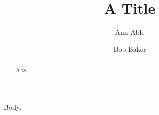 \documentclass[aip,jcp,reprint]{revtex4-2}
\begin{document}
\title{A Title}
\author{Ann Able}
\author{Bob Baker}
\begin{abstract}Abs.\end{abstract}
\maketitle
{}
Body.
\end{document}
